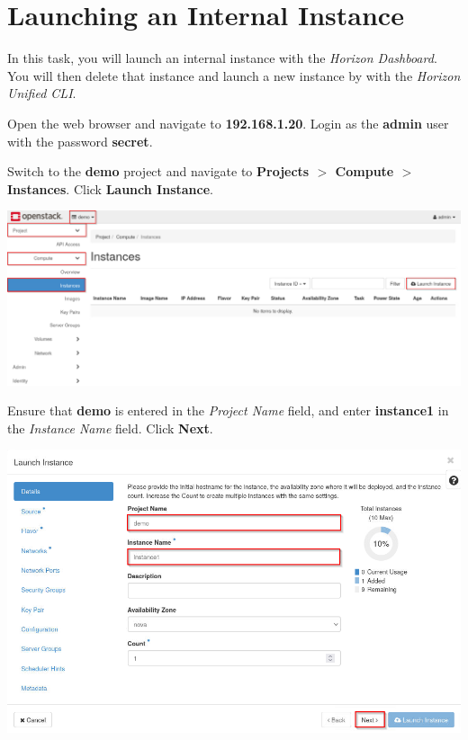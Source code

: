 \documentclass[letterpaper, 12pt]{article}
\begin{document}
\section{Launching an Internal Instance}\label{sec:launching-an-internal-instance}
In this task, you will launch an internal instance with the \textit{Horizon Dashboard}.
You will then delete that instance and launch a new instance by with the \textit{Horizon Unified CLI}.

\begin{enumerate}
    \begin{labstep}
        Open the web browser and navigate to \textbf{192.168.1.20}.
        Login as the \textbf{admin} user with the password \textbf{secret}.
    \end{labstep}

    \begin{labstep}
        Switch to the \textbf{demo} project and navigate to \textbf{Projects $>$ Compute $>$ Instances}.
        Click \textbf{Launch Instance}.

        \begin{center}
            \includegraphics[width=\linewidth]{images/part4/step2.png}
        \end{center}
    \end{labstep}

    \begin{labstep}
        Ensure that \textbf{demo} is entered in the \textit{Project Name} field, and enter \textbf{instance1} in the \textit{Instance Name} field.
        Click \textbf{Next}.

        \begin{center}
            \includegraphics[width=\linewidth]{images/part4/step3.png}
        \end{center}
    \end{labstep}


\end{enumerate}
\end{document}
